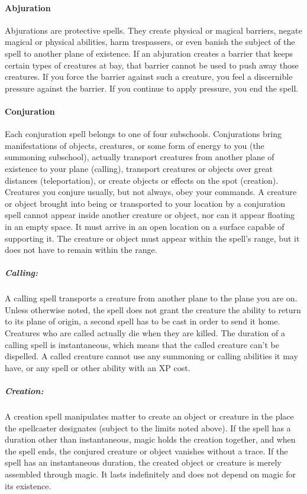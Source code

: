 \paragraph{Abjuration}
Abjurations are protective spells. They create physical or magical barriers, negate magical or physical abilities, 
harm trespassers, or even banish the subject of the spell to another plane of existence.
If an abjuration creates a barrier that keeps certain types of creatures at bay, 
that barrier cannot be used to push away those creatures. 
If you force the barrier against such a creature, you feel a discernible pressure against the barrier. 
If you continue to apply pressure, you end the spell.
\paragraph{Conjuration}
Each conjuration spell belongs to one of four subschools. 
Conjurations bring manifestations of objects, creatures, or some form of energy to you (the summoning subschool), 
actually transport creatures from another plane of existence to your plane (calling), 
transport creatures or objects over great distances (teleportation), 
or create objects or effects on the spot (creation). 
Creatures you conjure usually, but not always, obey your commands.
A creature or object brought into being or transported to your location by a conjuration spell cannot appear inside another creature or object, 
nor can it appear floating in an empty space. It must arrive in an open location on a surface capable of supporting it.
The creature or object must appear within the spell's range, but it does not have to remain within the range.

\subparagraph{Calling:}
A calling spell transports a creature from another plane to the plane you are on. 
Unless otherwise noted, the spell does not grant the creature the ability to return to its plane of origin,
a second spell has to be cast in order to send it home.
Creatures who are called actually die when they are killed.
The duration of a calling spell is instantaneous, 
which means that the called creature can't be dispelled.
A called creature cannot use any summoning or calling abilities it may have, or any spell or other ability with an XP cost.

\subparagraph{Creation:}
A creation spell manipulates matter to create an object or creature in the place the spellcaster designates (subject to the limits noted above). 
If the spell has a duration other than instantaneous, magic holds the creation together, and when the spell ends, 
the conjured creature or object vanishes without a trace. 
If the spell has an instantaneous duration, the created object or creature is merely assembled through magic. 
It lasts indefinitely and does not depend on magic for its existence.

